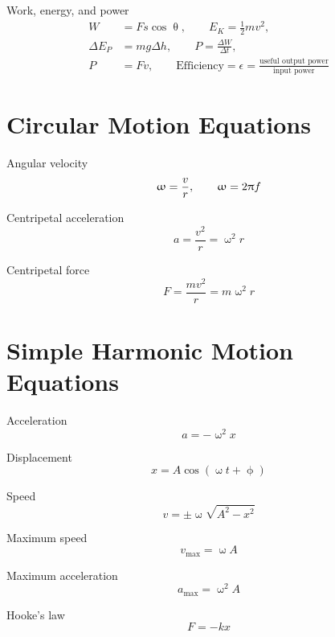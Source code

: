 \documentclass[a4paper,12pt]{book}
\begin{document}
Work, energy, and power
\begin{align*}
W&=Fs\cos\uptheta, \qquad  E_{K}=\frac{1}{2}mv^{2},\\
\Delta E_{P}&=mg\Delta h, \qquad P=\frac{\Delta W}{\Delta t},\\
P&=Fv, \qquad \text{Efficiency}=\epsilon =\frac{\text{useful output power}}{\text{input power}}
\end{align*}

\section*{Circular Motion Equations}

Angular velocity 
\begin{equation*}
\upomega=\frac{v}{r}, \qquad \upomega=2\uppi f
\end{equation*}

Centripetal acceleration
\begin{equation*}
a=\frac{v^{2}}{r}=\upomega^{2}r
\end{equation*}

Centripetal force
\begin{equation*}
F=\frac{mv^{2}}{r}=m\upomega^{2}r
\end{equation*}

\section*{Simple Harmonic Motion Equations}

Acceleration
\begin{equation*}
a=-\upomega^{2}x
\end{equation*}

Displacement
\begin{equation*}
x=A\cos\left(\upomega t+\upphi\right)
\end{equation*}

Speed
\begin{equation*}
v=\pm \upomega \sqrt{A^{2}-x^{2}}
\end{equation*}

Maximum speed
\begin{equation*}
v_{\text{max}}=\upomega A
\end{equation*}

Maximum acceleration
\begin{equation*}
a_{\text{max}}=\upomega^{2}A
\end{equation*}

Hooke's law
\begin{equation*}
F=-kx
\end{equation*}
\end{document}
